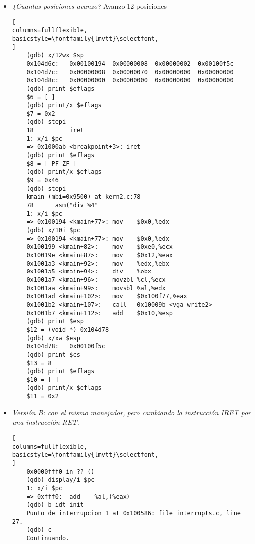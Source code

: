 \documentclass[a4paper, 12pt]{article}
\begin{document}
\begin{itemize}
\begin{lstlisting}[
columns=fullflexible,
basicstyle=\fontfamily{lmvtt}\selectfont,
]
	Breakpoint 1, idt_init () at interrupts.c:27
	27	    idt_install(T_BRKPT, breakpoint);
	1: x/i $pc
	=> 0x100586 <idt_init+3>:	push   $0x1000a8
	(gdb) finish
	Correr hasta la salida desde #0  idt_init () at interrupts.c:27
	kmain (mbi=0x9500) at kern2.c:73
	73	    asm("int3");  // (b)
	1: x/i $pc
	=> 0x100193 <kmain+76>:	int3
	(gdb) x/10i $pc
	=> 0x100193 <kmain+76>:	int3
	0x100194 <kmain+77>:	mov    $0x0,%edx
	0x100199 <kmain+82>:	mov    $0xe0,%ecx
	0x10019e <kmain+87>:	mov    $0x12,%eax
	0x1001a3 <kmain+92>:	mov    %edx,%ebx
	0x1001a5 <kmain+94>:	div    %ebx
	0x1001a7 <kmain+96>:	movzbl %cl,%ecx
	0x1001aa <kmain+99>:	movsbl %al,%edx
	0x1001ad <kmain+102>:	mov    $0x100f77,%eax
	0x1001b2 <kmain+107>:	call   0x10009b <vga_write2>
	(gdb) print $esp
	$1 = (void *) 0x104d78
	(gdb) x/xw $esp
	0x104d78:	0x00100f5c
	(gdb) print $cs
	$2 = 8
	(gdb) print $eflags
	$3 = [ ]
	(gdb) print/x $eflags
	$4 = 0x2
	(gdb) stepi
	breakpoint () at idt_entry.S:17
	17	        test %eax, %eax
	1: x/i $pc
	=> 0x1000a9 <breakpoint+1>:	test   %eax,%eax
	(gdb) print $esp
	$5 = (void *) 0x104d6c
\end{lstlisting}
				\item \textit{¿Cuantas posiciones avanzo?}
				Avanzo 12 posiciones
\begin{lstlisting}[
columns=fullflexible,
basicstyle=\fontfamily{lmvtt}\selectfont,
]
	(gdb) x/12wx $sp
	0x104d6c:	0x00100194	0x00000008	0x00000002	0x00100f5c
	0x104d7c:	0x00000008	0x00000070	0x00000000	0x00000000
	0x104d8c:	0x00000000	0x00000000	0x00000000	0x00000000
	(gdb) print $eflags
	$6 = [ ]
	(gdb) print/x $eflags
	$7 = 0x2
	(gdb) stepi
	18	        iret
	1: x/i $pc
	=> 0x1000ab <breakpoint+3>:	iret
	(gdb) print $eflags
	$8 = [ PF ZF ]
	(gdb) print/x $eflags
	$9 = 0x46
	(gdb) stepi
	kmain (mbi=0x9500) at kern2.c:78
	78	    asm("div %4"
	1: x/i $pc
	=> 0x100194 <kmain+77>:	mov    $0x0,%edx
	(gdb) x/10i $pc
	=> 0x100194 <kmain+77>:	mov    $0x0,%edx
	0x100199 <kmain+82>:	mov    $0xe0,%ecx
	0x10019e <kmain+87>:	mov    $0x12,%eax
	0x1001a3 <kmain+92>:	mov    %edx,%ebx
	0x1001a5 <kmain+94>:	div    %ebx
	0x1001a7 <kmain+96>:	movzbl %cl,%ecx
	0x1001aa <kmain+99>:	movsbl %al,%edx
	0x1001ad <kmain+102>:	mov    $0x100f77,%eax
	0x1001b2 <kmain+107>:	call   0x10009b <vga_write2>
	0x1001b7 <kmain+112>:	add    $0x10,%esp
	(gdb) print $esp
	$12 = (void *) 0x104d78
	(gdb) x/xw $esp
	0x104d78:	0x00100f5c
	(gdb) print $cs
	$13 = 8
	(gdb) print $eflags
	$10 = [ ]
	(gdb) print/x $eflags
	$11 = 0x2
\end{lstlisting}
				\item \textit{Versión B: con el mismo manejador, pero cambiando
				la instrucción IRET por una instrucción RET.\\}
\begin{lstlisting}[
columns=fullflexible,
basicstyle=\fontfamily{lmvtt}\selectfont,
]
	0x0000fff0 in ?? ()
	(gdb) display/i $pc
	1: x/i $pc
	=> 0xfff0:	add    %al,(%eax)
	(gdb) b idt_init
	Punto de interrupcion 1 at 0x100586: file interrupts.c, line 27.
	(gdb) c
	Continuando.


\end{lstlisting}
\end{itemize}
\end{document}
